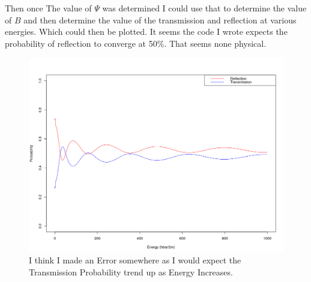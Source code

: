 \documentclass[12pt]{article}
\begin{document}
Then once The value of $\Psi$ was determined I could use that to determine the value of $B$ and then determine the value of the transmission and reflection at various energies. Which could then be plotted. It seems the code I wrote expects the probability of reflection to converge at 50\%. That seems none physical.

\begin{figure}
  \centering
  \includegraphics[width=500pt]{bounce.png}
  \caption{I think I made an Error somewhere as I would expect the Transmission Probability trend up as Energy Increases.}
\end{figure}
\end{document}
